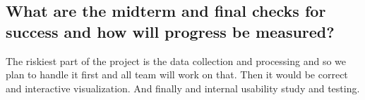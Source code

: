 \documentclass[sigconf,11pt]{acmart}
\begin{document}
\subsection*{What are the midterm and final checks for success and how will progress be measured?}
The riskiest part of the project is the data collection and processing and so we plan to handle it first and all team will work on that.
Then it would be correct and interactive visualization.
And finally and internal usability study and testing.










\end{document}
